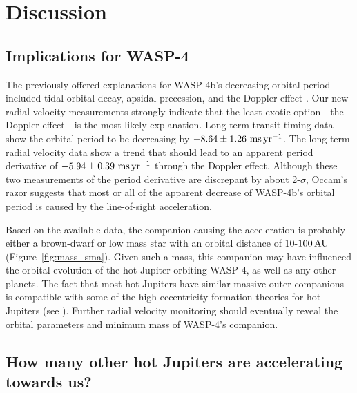 \documentclass[12pt,twocolumn,tighten]{aastex62}
\begin{document}
\section{Discussion}
\label{sec:discussion}

\subsection{Implications for WASP-4}

The previously offered explanations for WASP-4b's decreasing orbital
period included tidal orbital decay, apsidal precession, and the
Doppler effect \citep{bouma_wasp4b_2019}.  Our new radial velocity
measurements strongly indicate that the least exotic option---the
Doppler effect---is the most likely explanation.  Long-term transit
timing data show the orbital period to be decreasing by $- 8.64 \pm
1.26~{\rm ms}\,{\rm yr}^{-1}$.  The long-term radial velocity data
show a trend that should lead to an apparent period derivative of
$-5.94 \pm 0.39~{\rm ms}\,{\rm yr}^{-1}$ through the Doppler effect.
Although these two measurements of the period derivative are
discrepant by about 2-$\sigma$, Occam's razor suggests that most or
all of the apparent decrease of WASP-4b's orbital period is caused by
the line-of-sight acceleration.

Based on the available data, the companion causing the acceleration is
probably either a brown-dwarf or low mass star with an orbital
distance of $10$-$100\,{\rm AU}$ (Figure~\ref{fig:mass_sma}).  Given
such a mass, this companion may have influenced the orbital evolution
of the hot Jupiter orbiting WASP-4, as well as any other planets.  The
fact that most hot Jupiters have similar massive outer companions
\citep{knutson_friends_2014,bryan_statistics_2016} is compatible with
some of the high-eccentricity formation theories for hot Jupiters (see
\citealt{dawson_johnson_2018}).  Further radial velocity monitoring
should eventually reveal the orbital parameters and minimum mass of
WASP-4's companion.

\subsection{How many other hot Jupiters are accelerating towards us?}
\end{document}
